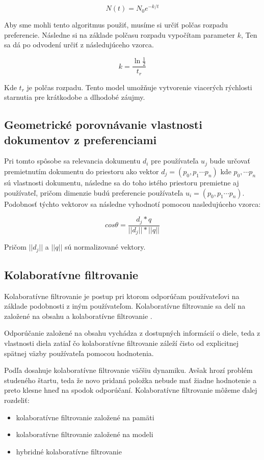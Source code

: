 \[N(t) = N_0e^{-k/t}\]

Aby sme mohli tento algoritmus použiť, musíme si určiť polčas rozpadu preferencie. Následne si na základe polčasu rozpadu vypočítam parameter \(k\), Ten sa dá po odvodení určiť z následujúceho vzorca.

\[k = \frac{\ln{\frac{1}{2}}}{t_r}\]\cite{7}

Kde \(t_r\) je polčas rozpadu. Tento model umožňuje vytvorenie viacerých rýchlosti starnutia pre krátkodobe a dlhodobé záujmy\cite{8}.


\subsection{Geometrické porovnávanie vlastnosti dokumentov z preferenciami}

Pri tomto spôsobe sa relevancia dokumentu \(d_i\) pre používateľa \(u_j\) bude určovať premietnutím dokumentu do priestoru ako vektor \(d_j=(p_0, p_1\cdots p_n)\) kde \(p_0, \cdots p_n\) sú vlastnosti dokumentu, následne sa do toho istého priestoru premietne aj používateľ, pričom dimenzie budú preferencie používateľa \(u_i=(p_0, p_1 \cdots p_n)\). Podobnosť týchto vektorov sa následne vyhodnotí pomocou nasledujúceho vzorca:

\[cos \theta = \frac{d_j * q}{||d_j||*||q||}\]



Pričom \(||d_j||\) a \(||q||\) sú normalizované vektory\cite{9}.


\subsection{Kolaboratívne filtrovanie}

Kolaboratívne filtrovanie je postup pri ktorom odporúčam používateľovi na základe podobnosti z iným používateľom. Kolaboratívne filtrovanie sa delí na založené na obsahu a kolaboratívne filtrovanie  \cite{10}.

Odporúčanie založené na obsahu vychádza z dostupných informácií o diele, teda z vlastnosti diela zatiaľ čo kolaboratívne filtrovanie záleží čisto od explicitnej spätnej väzby používateľa pomocou hodnotenia.

Podľa \cite{10} dosahuje kolaboratívne filtrovanie väčšiu dynamiku. Avšak hrozí problém studeného štartu, teda že novo pridaná položka nebude mať žiadne hodnotenie a preto klesne hneď na spodok odporúčaní. Kolaboratívne filtrovanie môžeme ďalej rozdeliť:

\begin{itemize}
\item{kolaboratívne filtrovanie založené na pamäti}
\item{kolaboratívne filtrovanie založené na modeli}
\item{hybridné kolaboratívne filtrovanie \cite{11}}
\end{itemize}

